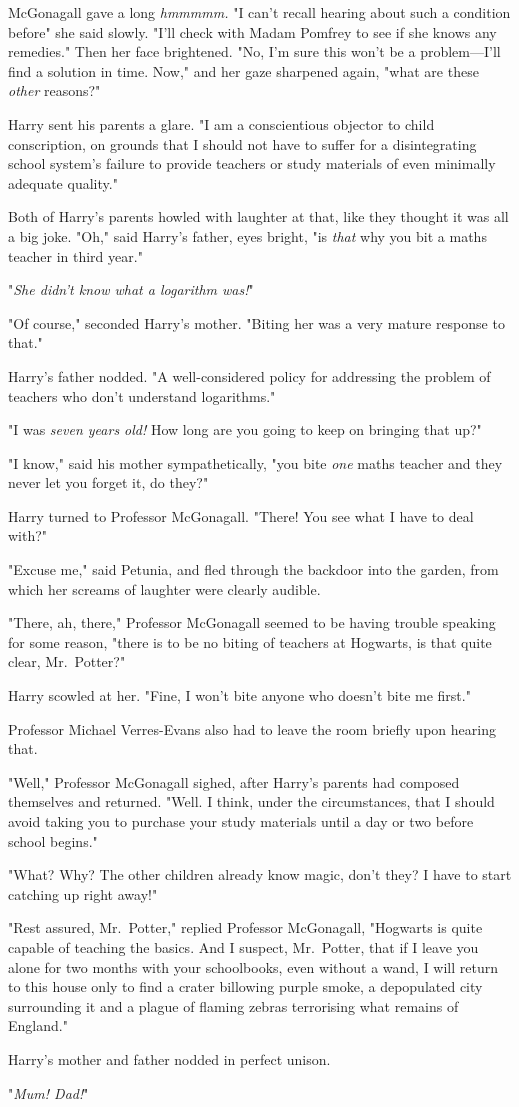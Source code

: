 McGonagall gave a long \emph{hmmmmm.} "I can't recall hearing about such a
condition before{\el}" she said slowly. "I'll check with Madam Pomfrey to
see if she knows any remedies." Then her face brightened. "No, I'm sure this
won't be a problem---I'll find a solution in time. Now," and her gaze sharpened
again, "what are these \emph{other} reasons?"

Harry sent his parents a glare. "I am a conscientious objector to child
conscription, on grounds that I should not have to suffer for a disintegrating
school system's failure to provide teachers or study materials of even
minimally adequate quality."

Both of Harry's parents howled with laughter at that, like they thought it was
all a big joke. "Oh," said Harry's father, eyes bright, "is \emph{that} why you
bit a maths teacher in third year."

"\emph{She didn't know what a logarithm was!}"

"Of course," seconded Harry's mother. "Biting her was a very mature response to
that."

Harry's father nodded. "A well-considered policy for addressing the problem of
teachers who don't understand logarithms."

"I was \emph{seven years old!} How long are you going to keep on bringing that
up?"

"I know," said his mother sympathetically, "you bite \emph{one} maths teacher
and they never let you forget it, do they?"

Harry turned to Professor McGonagall. "There! You see what I have to deal with?"

"Excuse me," said Petunia, and fled through the backdoor into the garden, from
which her screams of laughter were clearly audible.

"There, ah, there," Professor McGonagall seemed to be having trouble speaking
for some reason, "there is to be no biting of teachers at Hogwarts, is that
quite clear, Mr.~Potter?"

Harry scowled at her. "Fine, I won't bite anyone who doesn't bite me first."

Professor Michael Verres-Evans also had to leave the room briefly upon hearing
that.

"Well," Professor McGonagall sighed, after Harry's parents had composed
themselves and returned. "Well. I think, under the circumstances, that I should
avoid taking you to purchase your study materials until a day or two before
school begins."

"What? Why? The other children already know magic, don't they? I have to start
catching up right away!"

"Rest assured, Mr.~Potter," replied Professor McGonagall, "Hogwarts is quite
capable of teaching the basics. And I suspect, Mr.~Potter, that if I leave you
alone for two months with your schoolbooks, even without a wand, I will return
to this house only to find a crater billowing purple smoke, a depopulated city
surrounding it and a plague of flaming zebras terrorising what remains of
England."

Harry's mother and father nodded in perfect unison.

"\emph{Mum! Dad!}"
